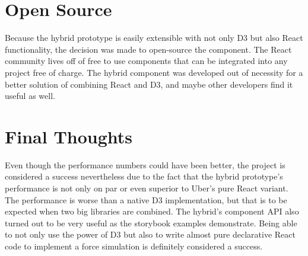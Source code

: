 \section{Open Source}

Because the hybrid prototype is easily extensible with not only D3 but also React functionality, the decision was made to open-source the component. The React community lives off of free to use components that can be integrated into any project free of charge. The hybrid component was developed out of necessity for a better solution of combining React and D3, and maybe other developers find it useful as well.

\section{Final Thoughts}

Even though the performance numbers could have been better, the project is considered a success nevertheless due to the fact that the hybrid prototype's performance is not only on par or even superior to Uber's pure React variant. The performance is worse than a native D3 implementation, but that is to be expected when two big libraries are combined. The hybrid's component API also turned out to be very useful as the storybook examples demonstrate. Being able to not only use the power of D3 but also to write almost pure declarative React code to implement a force simulation is definitely considered a success.







